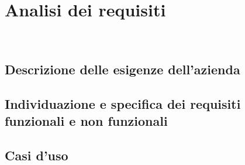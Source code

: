 \chapter{Analisi dei requisiti}
\label{cap:analisi-requisiti}
\\
\section{Descrizione delle esigenze dell'azienda}

\section{Individuazione e specifica dei requisiti funzionali e non funzionali}

\section{Casi d'uso}
